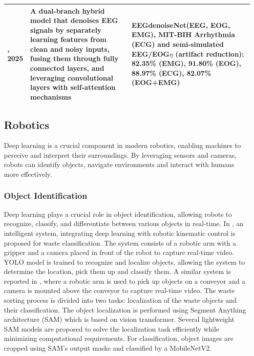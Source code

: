 \documentclass[preprint,12pt]{elsarticle}
\begin{document}
\begin{center}
\begin{table}
\begin{tabular}{|p{1cm} | p{6.5cm} | p{6.5cm}|}
 \hline
 \citep{cai_dhct-gan_2025}, 2025 & A dual-branch hybrid model that denoises EEG signals by separately learning features from clean and noisy inputs, fusing them through fully connected layers, and leveraging convolutional layers with self-attention mechanisms & EEGdenoiseNet(EEG, EOG, EMG), MIT-BIH Arrhythmia (ECG) and semi-simulated EEG/EOG\newline $\eta$ (artifact reduction): 82.35\% (EMG), 91.80\% (EOG), 88.97\% (ECG), 82.07\% (EOG+EMG)  \\ 
 \hline
\end{tabular}
\label{table_summary_eeg_studies}
\end{table}
\end{center}

\subsection{Robotics}
Deep learning is a crucial component in modern robotics, enabling machines to perceive and interpret their surroundings. By leveraging sensors and cameras, robots can identify objects, navigate environments and interact with humans more effectively.

\subsubsection{Object Identification}
Deep learning plays a crucial role in object identification, allowing robots to recognize, classify, and differentiate between various objects in real-time. In \citep{le_application_2025}, an intelligent system, integrating deep learning with robotic kinematic control is proposed for waste classification. The system consists of a robotic arm with a gripper and a camera placed in front of the robot to capture real-time video. YOLO model is trained to recognize and localize objects, allowing the system to determine the location, pick them up and classify them. A similar system is reported in \citep{vukicevic_versatile_2025}, where a robotic arm is used to pick up objects on a conveyor and a camera is mounted above the conveyor to capture real-time video. The waste sorting process is divided into two tasks: localization of the waste objects and their classification. The object localization is performed using Segment Anything architecture (SAM) \citep{kirillov_segment_2023} which is based on vision transformer. Several lightweight SAM models are proposed to solve the localization task efficiently while minimizing computational requirements. For classification, object images are cropped using SAM's output masks and classified by a MobileNetV2.
\end{document}
